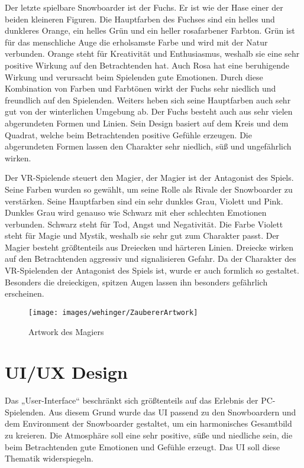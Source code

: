 Der letzte spielbare Snowboarder ist der Fuchs. Er ist wie der Hase einer der beiden kleineren Figuren. Die Hauptfarben des Fuchses sind ein helles und dunkleres Orange, ein helles Grün und ein heller rosafarbener Farbton. Grün ist für das menschliche Auge die erholsamste Farbe und wird mit der Natur verbunden. Orange steht für Kreativität und Enthusiasmus, weshalb sie eine sehr positive Wirkung auf den Betrachtenden hat. Auch Rosa hat eine beruhigende Wirkung und verursacht beim Spielenden gute Emotionen. Durch diese Kombination von Farben und Farbtönen wirkt der Fuchs sehr niedlich und freundlich auf den Spielenden. Weiters heben sich seine Hauptfarben auch sehr gut von der winterlichen Umgebung ab.
Der Fuchs besteht auch aus sehr vielen abgerundeten Formen und Linien. Sein Design basiert auf dem Kreis und dem Quadrat, welche beim Betrachtenden positive Gefühle erzeugen. Die abgerundeten Formen lassen den Charakter sehr niedlich, süß und ungefährlich wirken. 



Der VR-Spielende steuert den Magier, der Magier ist der Antagonist des Spiels. Seine Farben wurden so gewählt, um seine Rolle als Rivale der Snowboarder zu verstärken. Seine Hauptfarben sind ein sehr dunkles Grau, Violett und Pink. Dunkles Grau wird genauso wie Schwarz mit eher schlechten Emotionen verbunden. Schwarz steht für Tod, Angst und Negativität. Die Farbe Violett steht für Magie und Mystik, weshalb sie sehr gut zum Charakter passt.
Der Magier besteht größtenteils aus Dreiecken und härteren Linien. Dreiecke wirken auf den Betrachtenden aggressiv und signalisieren Gefahr. Da der Charakter des VR-Spielenden der Antagonist des Spiels ist, wurde er auch formlich so gestaltet. Besonders die dreieckigen, spitzen Augen lassen ihn besonders gefährlich erscheinen.

\begin{figure}[H]
	\centering
	\texttt{[image: images/wehinger/ZaubererArtwork]}
	\caption{Artwork des Magiers}
\end{figure}


\section{UI/UX Design}
Das „User-Interface“ beschränkt sich größtenteils auf das Erlebnis der PC-Spielenden. Aus diesem Grund wurde das UI passend zu den Snowboardern und dem Environment der Snowboarder gestaltet, um ein harmonisches Gesamtbild zu kreieren. Die Atmosphäre soll eine sehr positive, süße und niedliche sein, die beim Betrachtenden gute Emotionen und Gefühle erzeugt. Das UI soll diese Thematik widerspiegeln.

